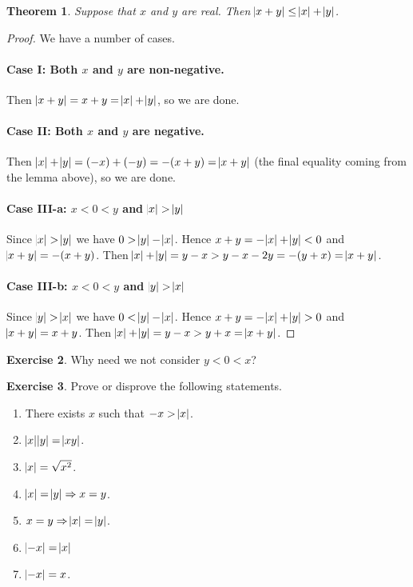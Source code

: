 \documentclass[a4paper, 10pt]{amsart}
\newtheorem{thm}{Theorem}[section]
\theoremstyle{definition}
\newtheorem{exercise}[thm]{Exercise}
\theoremstyle{remark}
\begin{document}
\begin{thm}
  Suppose that $ x $ and $ y $ are real. Then $ \abs{x + y} \leq \abs{x} + \abs{y} $.
\end{thm}
\begin{proof}
  We have a number of cases.

  \paragraph{Case I: Both $ x $ and $ y $ are non-negative.}
  Then $ \abs{x + y} = x + y = \abs{x} + \abs{y} $, so we are done.

  \paragraph{Case II: Both $ x $ and $ y $ are negative.}
  Then $ \abs{x} + \abs{y} = (-x) + (-y) = -(x + y) = \abs{x + y} $ (the final equality coming from the lemma above), so we are done.

  \paragraph{Case III-a: $ x < 0 < y $ and $ \abs{x} > \abs{y} $}
  Since $ \abs{x} > \abs{y} $ we have $ 0 > \abs{y} - \abs{x} $. Hence $ x + y = -\abs{x} + \abs{y} < 0 $ and $ \abs{x + y} = -(x + y) $.
  Then $ \abs{x} + \abs{y} = y - x > y - x - 2y = -(y + x) = \abs{x + y} $.

  \paragraph{Case III-b: $ x < 0 < y $ and $ \abs{y} > \abs{x} $}
  Since $ \abs{y} > \abs{x} $ we have $ 0 < \abs{y} - \abs{x} $. Hence $ x + y = -\abs{x} + \abs{y} > 0 $ and $ \abs{x + y} = x + y $.
  Then $ \abs{x} + \abs{y} = y - x > y + x = \abs{x + y} $.
\end{proof}

\begin{exercise}
  Why need we not consider $ y < 0 < x $?
\end{exercise}

\begin{exercise}
  Prove or disprove the following statements.
  \begin{enumerate}
    \item There exists $ x $ such that $ -x > \abs{x} $.
    \item $ \abs{x}\abs{y} = \abs{xy} $.
    \item $ \abs{x} = \sqrt{x^2} $.
    \item $ \abs{x} = \abs{y} \Rightarrow x = y $.
    \item $ x = y \Rightarrow \abs{x} = \abs{y} $.
    \item $ \abs{-x} = \abs{x} $
    \item $ \abs{-x} = x $.
  \end{enumerate}
\end{exercise}
\end{document}
